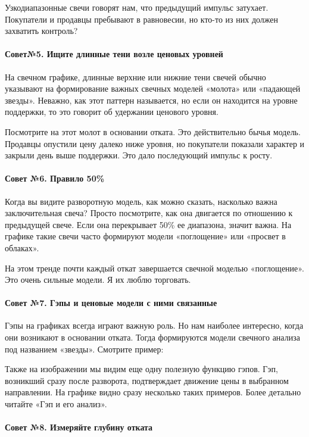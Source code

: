 \documentclass{book}
\begin{document}
Узкодиапазонные свечи говорят нам, что предыдущий импульс
затухает. Покупатели и продавцы пребывают в равновесии, но кто-то из
них должен захватить контроль?

\paragraph{Совет№5. Ищите длинные тени возле ценовых уровней}

На свечном графике, длинные верхние или нижние тени свечей обычно указывают на формирование важных свечных моделей «молота» или «падающей звезды». Неважно, как этот паттерн называется, но если он находится на уровне поддержки, то это говорит об удержании ценового уровня.

Посмотрите на этот молот в основании отката. Это действительно бычья
модель. Продавцы опустили цену далеко ниже уровня, но покупатели
показали характер и закрыли день выше поддержки. Это дало последующий
импульс к росту.

\paragraph{Совет №6. Правило 50\%}

Когда вы видите разворотную модель, как можно сказать, насколько важна заключительная свеча? Просто посмотрите, как она двигается по отношению к предыдущей свече. Если она перекрывает 50\% ее диапазона, значит важна. На графике такие свечи часто формируют модели «поглощение» или «просвет в облаках».

На этом тренде почти каждый откат завершается свечной моделью «поглощение». Это очень сильные модели. Я их люблю торговать.

\paragraph{Совет №7. Гэпы и ценовые модели с ними связанные}

Гэпы на графиках всегда играют важную роль. Но нам наиболее интересно, когда они возникают в основании отката. Тогда формируются модели свечного анализа под названием «звезды». Смотрите пример:

Также на изображении мы видим еще одну полезную функцию гэпов. Гэп,
возникший сразу после разворота, подтверждает движение цены в
выбранном направлении. На графике видно сразу несколько таких
примеров. Более детально читайте «Гэп и его анализ».

\paragraph{Совет №8. Измеряйте глубину отката}
\end{document}

